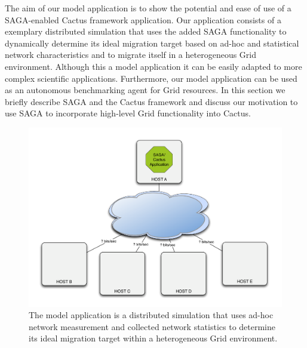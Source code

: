 \documentclass[conference,final]{IEEEtran}
\begin{document}
The aim of our model application is to show the potential and ease of
use of a SAGA-enabled Cactus framework application. Our application
consists of a exemplary distributed simulation that uses the added
SAGA functionality to dynamically determine its ideal migration target
based on ad-hoc and statistical network characteristics and to migrate
itself in a heterogeneous Grid environment.  Although this a model
application it can be easily adapted to more complex scientific
applications.  Furthermore, our model application can be used as an
autonomous benchmarking agent for Grid resources. In this section we
briefly describe SAGA and the Cactus framework and discuss our
motivation to use SAGA to incorporate high-level Grid functionality
into Cactus.


\begin{figure}
\begin{center}
\includegraphics[scale=0.30]{./figures/figure_00}
\end{center}
\caption{The model application is a distributed simulation that uses ad-hoc network measurement and collected network statistics to determine its ideal migration target within a heterogeneous Grid environment. }
\label{fig:algo}
\end{figure}
\end{document}

